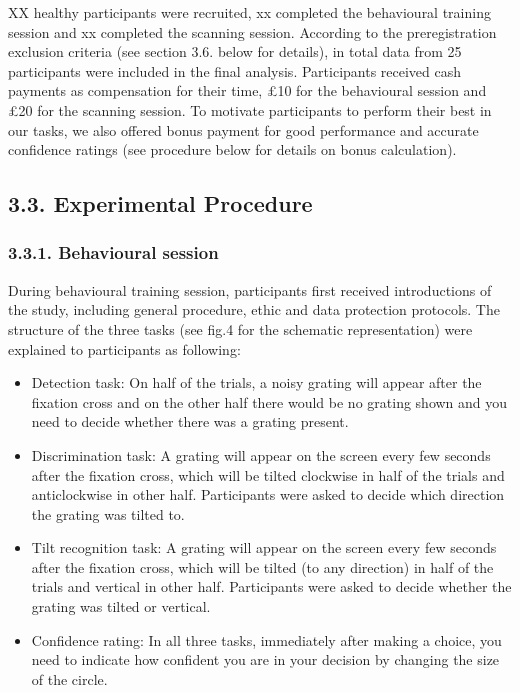 \documentclass[
]{article}
\begin{document}
XX healthy participants were recruited, xx completed the behavioural
training session and xx completed the scanning session. According to the
preregistration exclusion criteria (see section 3.6. below for details),
in total data from 25 participants were included in the final analysis.
Participants received cash payments as compensation for their time, £10
for the behavioural session and £20 for the scanning session. To
motivate participants to perform their best in our tasks, we also
offered bonus payment for good performance and accurate confidence
ratings (see procedure below for details on bonus calculation).

\hypertarget{experimental-procedure}{%
\subsection{3.3. Experimental Procedure}\label{experimental-procedure}}

\hypertarget{behavioural-session}{%
\subsubsection{3.3.1. Behavioural session}\label{behavioural-session}}

During behavioural training session, participants first received
introductions of the study, including general procedure, ethic and data
protection protocols. The structure of the three tasks (see fig.4 for
the schematic representation) were explained to participants as
following:

\begin{itemize}
\item
  Detection task: On half of the trials, a noisy grating will appear
  after the fixation cross and on the other half there would be no
  grating shown and you need to decide whether there was a grating
  present.
\item
  Discrimination task: A grating will appear on the screen every few
  seconds after the fixation cross, which will be tilted clockwise in
  half of the trials and anticlockwise in other half. Participants were
  asked to decide which direction the grating was tilted to.
\item
  Tilt recognition task: A grating will appear on the screen every few
  seconds after the fixation cross, which will be tilted (to any
  direction) in half of the trials and vertical in other half.
  Participants were asked to decide whether the grating was tilted or
  vertical.
\item
  Confidence rating: In all three tasks, immediately after making a
  choice, you need to indicate how confident you are in your decision by
  changing the size of the circle.
\end{itemize}
\end{document}
